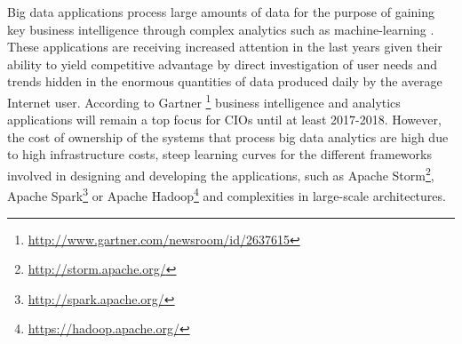 
Big data applications process large amounts of data for the purpose of gaining key business intelligence through complex analytics such as machine-learning \cite{bdsurvey, ml4bd}. These applications are receiving increased attention in the last years given their ability to yield competitive advantage by direct investigation of user needs and trends hidden in the enormous quantities of data produced daily by the average Internet user. According to Gartner \footnote{\url{http://www.gartner.com/newsroom/id/2637615}} business intelligence and analytics applications will remain a top focus for CIOs until at least 2017-2018.
However, the cost of ownership of the systems that process big data analytics are high due to high infrastructure costs, steep learning curves for the different frameworks involved in designing and developing the applications, such as Apache Storm\footnote{\url{http://storm.apache.org/}}, Apache Spark\footnote{\url{http://spark.apache.org/}} or Apache Hadoop\footnote{\url{https://hadoop.apache.org/}} and complexities in large-scale architectures.

